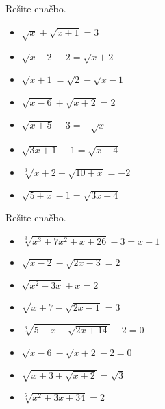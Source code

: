         
            \begin{naloga}
                Rešite enačbo.
                \begin{itemize}
                    \item $\displaystyle \sqrt{x}+\sqrt{x+1}=3$ 
                    \item $\displaystyle \sqrt{x-2}-2=\sqrt{x+2}$ 
                    \item $\displaystyle \sqrt{x+1}=\sqrt{2}-\sqrt{x-1}$ 
                    \item $\displaystyle \sqrt{x-6}+\sqrt{x+2}=2$ 
                    \item $\displaystyle \sqrt{x+5}-3=-\sqrt{x}$ 
                    \item $\displaystyle \sqrt{3x+1}-1=\sqrt{x+4}$ 
                    \item $\displaystyle \sqrt[3]{x+2-\sqrt{10+x}}=-2$ 
                    \item $\displaystyle \sqrt{5+x}-1=\sqrt{3x+4}$ 
                \end{itemize}
            \end{naloga}
        



        
            \begin{naloga}
                Rešite enačbo.
                \begin{itemize}
                    \item $\displaystyle \sqrt[3]{x^3+7x^2+x+26}-3=x-1$ 
                    \item $\displaystyle \sqrt{x-2}-\sqrt{2x-3}=2$ 
                    \item $\displaystyle \sqrt{x^2+3x}+x=2$ 
                    \item $\displaystyle \sqrt{x+7-\sqrt{2x-1}}=3$ 
                    \item $\displaystyle \sqrt[3]{5-x+\sqrt{2x+14}}-2=0$ 
                    \item $\displaystyle \sqrt{x-6}-\sqrt{x+2}-2=0$ 
                    \item $\displaystyle \sqrt{x+3+\sqrt{x+2}}=\sqrt{3}$ 
                    \item $\displaystyle \sqrt[5]{x^2+3x+34}=2$ 
                \end{itemize}
            \end{naloga}
        
